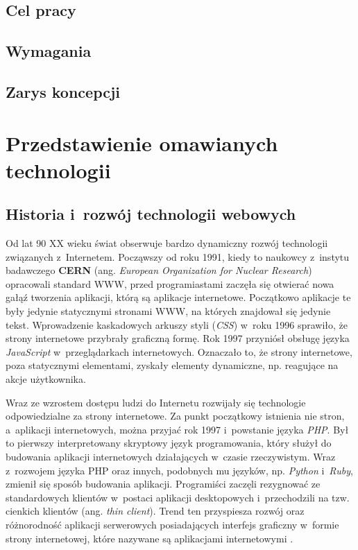 \documentclass[mgr,oneside]{mgr}
\begin{document}
\section{Cel pracy}

\section{Wymagania}
\section{Zarys koncepcji}

\chapter{Przedstawienie omawianych technologii}
\section{Historia i~rozwój technologii webowych}
Od lat 90 XX wieku świat obserwuje bardzo dynamiczny rozwój technologii związanych z~Internetem. Począwszy od roku 1991, kiedy to naukowcy z~instytu badawczego \textbf{CERN} (ang. \textit{European Organization for Nuclear Research}) opracowali standard WWW, przed programiastami zaczęła się otwierać nowa gałąź tworzenia aplikacji, którą są aplikacje internetowe. Początkowo aplikacje te były jedynie statycznymi stronami WWW, na których znajdował się jedynie tekst. Wprowadzenie kaskadowych arkuszy styli (\emph{CSS}) w~roku 1996 sprawiło, że strony internetowe przybrały graficzną formę. Rok 1997 przyniósł obsługę języka \emph{JavaScript} w~przeglądarkach internetowych. Oznaczało to, że strony internetowe, poza statycznymi elementami, zyskały elementy dynamiczne, np. reagujące na akcje użytkownika.

Wraz ze wzrostem dostępu ludzi do Internetu rozwijały się technologie odpowiedzialne za strony internetowe. Za punkt początkowy istnienia nie stron, a~aplikacji internetowych, można przyjać rok 1997 i~powstanie języka \emph{PHP}. Był to pierwszy interpretowany skryptowy język programowania, który służył do budowania aplikacji internetowych działających w~czasie rzeczywistym. Wraz z~rozwojem języka PHP oraz innych, podobnych mu języków, np. \emph{Python} i~\emph{Ruby}, zmienił się sposób budowania aplikacji. Programiści zaczęli rezygnować ze standardowych klientów w~postaci aplikacji desktopowych i~przechodzili na tzw. cienkich klientów (ang. \textit{thin client}). Trend ten przyspiesza rozwój oraz różnorodność aplikacji serwerowych posiadających interfejs graficzny w~formie strony internetowej, które nazywane są aplikacjami internetowymi \cite{historia}.
\end{document}
